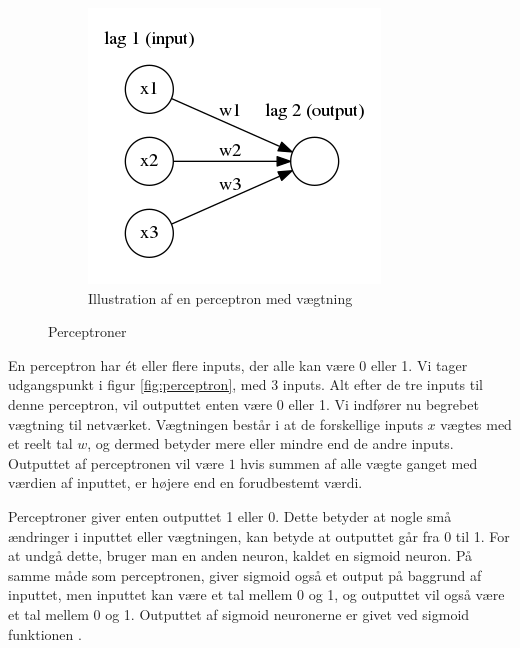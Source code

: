 \begin{figure}[h!]
\begin{subfigure}[b]{0.4\textwidth}
        \includegraphics[width=\textwidth]{images/neural2.png}
		\caption{Illustration af en perceptron med vægtning}
		\label{fig:perceptronWeight}
    \end{subfigure}
    
    \caption{Perceptroner}\label{fig:perceptroner}
\end{figure}



En perceptron har \'et eller flere inputs, der alle kan være 0 eller 1. Vi tager udgangspunkt i figur \ref{fig:perceptron}, med 3 inputs. Alt efter de tre inputs til denne perceptron, vil outputtet enten være 0 eller 1. Vi indfører nu begrebet vægtning til netværket. Vægtningen består i at de forskellige inputs $x$ vægtes med et reelt tal $w$, og dermed betyder mere eller mindre end de andre inputs. Outputtet af perceptronen vil være $1$ hvis summen af alle vægte ganget med værdien af inputtet, er højere end en forudbestemt værdi.


Perceptroner giver enten outputtet 1 eller 0. Dette betyder at nogle små ændringer i inputtet eller vægtningen, kan betyde at outputtet går fra 0 til 1. For at undgå dette, bruger man en anden neuron, kaldet en sigmoid neuron. På samme måde som perceptronen, giver sigmoid også et output på baggrund af inputtet, men inputtet kan være et tal mellem 0 og 1, og outputtet vil også være et tal mellem 0 og 1. Outputtet af sigmoid neuronerne er givet ved sigmoid funktionen \cite{neural}.


